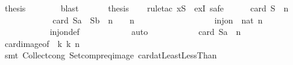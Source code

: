 \begin{isabellebody}
\ {\isacharquery}thesis\isanewline
\ \ \ \ \ \ \isamarkupfalse%
\ blast\isanewline
\ \ \isamarkupfalse%
\isanewline
\isanewline
\ \ \isamarkupfalse%
\ {\isacharquery}thesis\isanewline
\ \ \isamarkupfalse%
\ {\isacharparenleft}rule{\isacharunderscore}tac\ x{\isacharequal}{\isachardoublequoteopen}{\isacharquery}S{\isachardoublequoteclose}\ \ exI{\isacharcomma}\ safe{\isacharparenright}\isanewline
\ \ \ \ \isamarkupfalse%
\ {\isachardoublequoteopen}card\ {\isacharquery}S\ {\isacharequal}\ {}{\isacharasterisk}n{\isachardoublequoteclose}\isanewline
\ \ \ \ \isamarkupfalse%
{\isacharminus}\isanewline
\ \ \ \ \ \ \isamarkupfalse%
\ {\isachardoublequoteopen}card\ {\isacharparenleft}{\isacharquery}Sa\ {\isasymunion}\ {\isacharquery}Sb{\isacharparenright}\ {\isacharequal}\ {\isacharparenleft}n\ {\isacharminus}\ {}{\isacharparenright}\ {\isacharplus}\ {\isacharparenleft}n\ {\isacharminus}\ {}{\isacharparenright}{\isachardoublequoteclose}\isanewline
\ \ \ \ \ \ \isamarkupfalse%
{\isacharminus}\isanewline
\ \ \ \ \ \ \ \ \isamarkupfalse%
\ {\isachardoublequoteopen}inj{\isacharunderscore}on\ {\isacharparenleft}{\isacharparenleft}{\isacharcircum}{\isacharparenright}\ {\isacharparenleft}{}{\isacharcolon}{\isacharcolon}nat{\isacharparenright}{\isacharparenright}\ {\isacharbraceleft}{}{\isachardot}{\isachardot}{\isacharless}n{\isacharbraceright}{\isachardoublequoteclose}\isanewline
\ \ \ \ \ \ \ \ \ \ \isamarkupfalse%
\ inj{\isacharunderscore}on{\isacharunderscore}def\isanewline
\ \ \ \ \ \ \ \ \ \ \isamarkupfalse%
\ auto\isanewline
\ \ \ \ \ \ \ \ \isamarkupfalse%
\ \isamarkupfalse%
\ {\isachardoublequoteopen}card\ {\isacharquery}Sa\ {\isacharequal}\ n{\isacharminus}{}{\isachardoublequoteclose}\isanewline
\ \ \ \ \ \ \ \ \ \ \isamarkupfalse%
\ card{\isacharunderscore}image{\isacharbrackleft}of\ {\isachardoublequoteopen}{\isasymlambda}\ k{\isachardot}\ {}{\isacharcircum}k{\isachardoublequoteclose}\ {\isachardoublequoteopen}{\isacharbraceleft}{}{\isachardot}{\isachardot}{\isacharless}n{\isacharbraceright}{\isachardoublequoteclose}{\isacharbrackright}\isanewline
\ \ \ \ \ \ \ \ \ \ \isamarkupfalse%
\ {\isacharparenleft}smt\ Collect{\isacharunderscore}cong\ Setcompr{\isacharunderscore}eq{\isacharunderscore}image\ card{\isacharunderscore}atLeastLessThan{\isacharparenright}\isanewline

\end{isabellebody}
